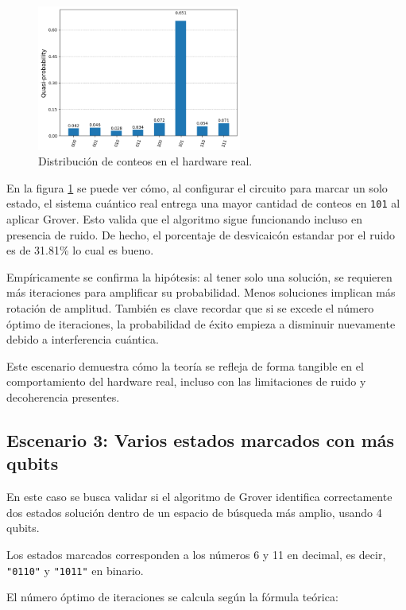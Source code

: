 \documentclass{article}
\begin{document}
\begin{figure}[H]
    \centering
    \includegraphics[width=0.6\textwidth]{hist2.png}
    \caption{Distribución de conteos en el hardware real.}
    \label{fig:grover_histogram2}
\end{figure}

En la figura \ref{fig:grover_histogram2} se puede ver cómo, al configurar el 
circuito para marcar un solo estado, el sistema cuántico real entrega una mayor 
cantidad de conteos en \texttt{101} al aplicar Grover. Esto valida que el algoritmo 
sigue funcionando incluso en presencia de ruido. De hecho, 
el porcentaje de desvicaicón estandar por el ruido es de 31.81\% lo cual es bueno.

Empíricamente se confirma la hipótesis: al tener solo una solución, se requieren 
más iteraciones para amplificar su probabilidad. Menos soluciones implican más 
rotación de amplitud. También es clave recordar que si se excede el número 
óptimo de iteraciones, la probabilidad de éxito empieza a disminuir nuevamente 
debido a interferencia cuántica.

Este escenario demuestra cómo la teoría se refleja de forma tangible en el 
comportamiento del hardware real, incluso con las limitaciones de ruido y 
decoherencia presentes.

 
\subsection{Escenario 3: Varios estados marcados con más qubits}

En este caso se busca validar si el algoritmo de Grover identifica correctamente 
dos estados solución dentro de un espacio de búsqueda más amplio, usando 4 qubits.

Los estados marcados corresponden a los números 6 y 11 en decimal, es decir,
\texttt{"0110"} y \texttt{"1011"} en binario.

El número óptimo de iteraciones se calcula según la fórmula teórica:
\end{document}
